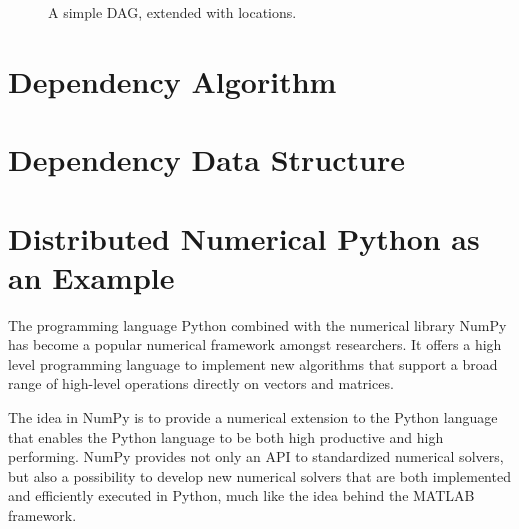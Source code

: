 \documentclass{acm_proc_article-sp}
\begin{document}
\begin{figure}
  \begin{center}
    \caption{A simple DAG, extended with locations.}
    \label{fig:MonteCarlo}
  \end{center}
\end{figure}





\section{Dependency Algorithm}


\section{Dependency Data Structure}



\section{Distributed Numerical Python as an Example}
The programming language Python combined with the numerical library NumPy\cite{numpy} has become a popular numerical framework amongst researchers. It offers a high level programming language to implement new algorithms that support a broad range of high-level operations directly on vectors and matrices.

The idea in NumPy is to provide a numerical extension to the Python language that enables the Python language to be both high productive and high performing. NumPy provides not only an API to standardized numerical solvers, but also a possibility to develop new numerical solvers that are both implemented and efficiently executed in Python, much like the idea behind the MATLAB\cite{guide1998mathworks} framework. 
\end{document}
